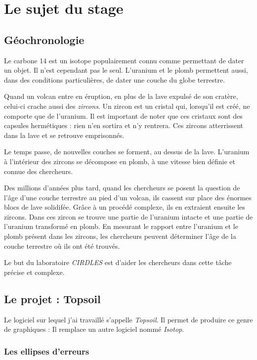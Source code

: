 ﻿\chapter{Le sujet du stage}
\section{Géochronologie} %
Le carbone 14 est un isotope populairement connu comme permettant de dater un objet. Il n'est cependant pas le seul. L'uranium et le plomb permettent aussi, dans des conditions particulières, de dater une couche du globe terrestre.

Quand un volcan entre en éruption, en plus de la lave expulsé de son cratère, celui-ci crache aussi des \textit{zircons}. Un zircon est un cristal qui, lorsqu'il est créé, ne comporte que de l'uranium. Il est important de noter que ces cristaux sont des capsules hermétiques : rien n'en sortira et n'y rentrera. Ces zircons atterrissent dans la lave et se retrouve emprisonnés. 

Le temps passe, de nouvelles couches se forment, au dessus de la lave. L'uranium à l'intérieur des zircons se décompose en plomb, à une vitesse bien définie et connue des chercheurs. 

Des millions d'années plus tard, quand les chercheurs se posent la question de l'âge d'une couche terrestre au pied d'un volcan, ils cassent sur place des énormes blocs de lave solidifée. Grâce à un procédé complexe, ils en extraient ensuite les zircons. Dans ces zircon se trouve une partie de l'uranium intacte et une partie de l'uranium transformé en plomb. En mesurant le rapport entre l'uranium et le plomb présent dans les zircons, les chercheurs peuvent déterminer l'âge de la couche terrestre où ils ont été trouvés.

Le but du laboratoire \textit{CIRDLES} est d'aider les chercheurs dans cette tâche précise et complexe.

\section{Le projet : Topsoil}
Le logiciel sur lequel j'ai travaillé s'appelle \textit{Topsoil}. Il permet de produire ce genre de graphiques :
Il remplace un autre logiciel nommé \textit{Isotop}.

\subsection{Les ellipses d'erreurs}

